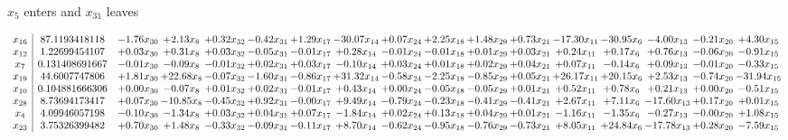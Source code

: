 \documentclass[9pt]{article}
\begin{document}
 $ x_{5} $ enters and $ x_{31} $ leaves 

 \[\begin{array}{c| c c@{\hskip 2pt} c@{\hskip 2pt} c@{\hskip 2pt} c@{\hskip 2pt} c@{\hskip 2pt} c@{\hskip 2pt} c@{\hskip 2pt} c@{\hskip 2pt} c@{\hskip 2pt} c@{\hskip 2pt} c@{\hskip 2pt} c@{\hskip 2pt} c@{\hskip 2pt} c@{\hskip 2pt} c@{\hskip 2pt} }
 x_{16}   &  87.1193418118 & -1.76 x_{30} & +  2.13 x_{8} & +  0.32 x_{32} & -0.42 x_{31} & +  1.29 x_{17} & -30.07 x_{14} & +  0.07 x_{24} & +  2.25 x_{18} & +  1.48 x_{29} & +  0.73 x_{21} & -17.30 x_{11} & -30.95 x_{6} & -4.00 x_{13} & -0.21 x_{20} & +  4.30 x_{15}\\
 x_{12}   &  1.22699454107 & +  0.03 x_{30} & +  0.31 x_{8} & +  0.03 x_{32} & -0.05 x_{31} & -0.01 x_{17} & +  0.28 x_{14} & -0.01 x_{24} & -0.01 x_{18} & +  0.01 x_{29} & +  0.03 x_{21} & +  0.24 x_{11} & +  0.17 x_{6} & +  0.76 x_{13} & -0.06 x_{20} & -0.91 x_{15}\\
 x_{7}   &  0.131408691667 & -0.01 x_{30} & -0.09 x_{8} & -0.01 x_{32} & +  0.02 x_{31} & +  0.03 x_{17} & -0.10 x_{14} & +  0.03 x_{24} & +  0.01 x_{18} & +  0.02 x_{29} & +  0.04 x_{21} & +  0.07 x_{11} & -0.14 x_{6} & +  0.09 x_{13} & -0.01 x_{20} & -0.33 x_{15}\\
 x_{19}   &  44.6007747806 & +  1.81 x_{30} & + 22.68 x_{8} & -0.07 x_{32} & -1.60 x_{31} & -0.86 x_{17} & + 31.32 x_{14} & -0.58 x_{24} & -2.25 x_{18} & -0.85 x_{29} & +  0.05 x_{21} & + 26.17 x_{11} & + 20.15 x_{6} & +  2.53 x_{13} & -0.74 x_{20} & -31.94 x_{15}\\
 x_{10}   &  0.104881666306 & +  0.00 x_{30} & -0.07 x_{8} & +  0.01 x_{32} & +  0.02 x_{31} & -0.01 x_{17} & +  0.43 x_{14} & +  0.00 x_{24} & -0.05 x_{18} & -0.05 x_{29} & +  0.01 x_{21} & +  0.52 x_{11} & +  0.78 x_{6} & +  0.21 x_{13} & +  0.00 x_{20} & -0.51 x_{15}\\
 x_{28}   &  8.73694173417 & +  0.07 x_{30} & -10.85 x_{8} & -0.45 x_{32} & +  0.92 x_{31} & -0.00 x_{17} & +  9.49 x_{14} & -0.79 x_{24} & -0.23 x_{18} & -0.41 x_{29} & -0.41 x_{21} & +  2.67 x_{11} & +  7.11 x_{6} & -17.60 x_{13} & +  0.17 x_{20} & +  0.01 x_{15}\\
 x_{4}   &  4.09946057198 & -0.10 x_{30} & -1.34 x_{8} & +  0.03 x_{32} & +  0.04 x_{31} & +  0.07 x_{17} & -1.84 x_{14} & +  0.02 x_{24} & +  0.13 x_{18} & +  0.04 x_{29} & +  0.01 x_{21} & -1.16 x_{11} & -1.35 x_{6} & -0.27 x_{13} & -0.00 x_{20} & +  1.08 x_{15}\\
 x_{23}   &  3.75326399482 & +  0.70 x_{30} & +  1.48 x_{8} & -0.33 x_{32} & -0.09 x_{31} & -0.11 x_{17} & +  8.70 x_{14} & -0.62 x_{24} & -0.95 x_{18} & -0.76 x_{29} & -0.73 x_{21} & +  8.05 x_{11} & + 24.84 x_{6} & -17.78 x_{13} & +  0.28 x_{20} & -7.59 x_{15}\\

\end{array}\]
\end{document}
